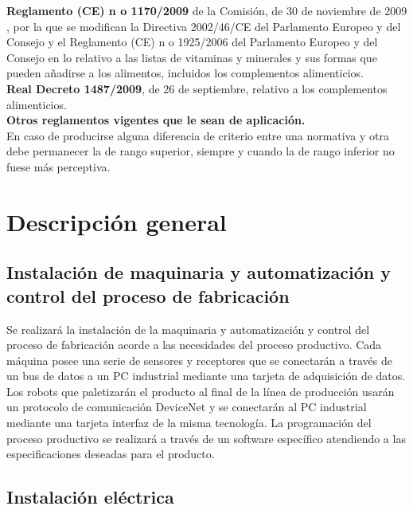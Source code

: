{\bfseries Reglamento (CE) n o 1170/2009} de la Comisión, de 30 de noviembre de 2009 , por la que se modifican la Directiva 2002/46/CE del Parlamento Europeo y del Consejo y el Reglamento (CE) n o 1925/2006 del Parlamento Europeo y del Consejo en lo relativo a las listas de vitaminas y minerales y sus formas que pueden añadirse a los alimentos, incluidos los complementos alimenticios.\\

{\bfseries Real Decreto 1487/2009}, de 26 de septiembre, relativo a los complementos
alimenticios.\\

{\bfseries Otros reglamentos vigentes que le sean de aplicación.}\\

En caso de producirse alguna diferencia de criterio entre una normativa y otra debe permanecer la de rango superior, siempre y cuando la de rango inferior no fuese más perceptiva.

\pagebreak

\section{Descripción general}

\subsection{Instalación de maquinaria y automatización y control del proceso de fabricación}

Se realizará la instalación de la maquinaria y automatización y control del proceso de fabricación acorde a las necesidades del proceso productivo. Cada máquina posee una serie de sensores y receptores que se conectarán a través de un bus de datos  a un PC industrial mediante una tarjeta de adquisición de datos. Los robots que paletizarán el producto al final de la línea de producción usarán un protocolo de comunicación DeviceNet y se conectarán al PC industrial mediante una tarjeta interfaz de la misma tecnología. La programación del proceso productivo se realizará a través de un software específico atendiendo a las especificaciones deseadas para el producto.

\subsection{Instalación eléctrica}

